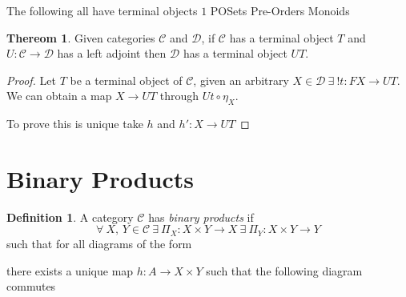 \documentclass{article}
\theoremstyle{definition}
\newtheorem{definition}{Definition}[section]
\newtheorem{theorem}{Thereom}[section]
\newcommand{\C}{\mathcal{C}}
\newcommand{\D}{\mathcal{D}}
\begin{document}
The following all have terminal objects $1$
POSets
Pre-Orders
Monoids

\begin{theorem}
    Given categories $\C$ and $\D$,
    if $\C$ has a terminal object $T$
    and $U : \C \rightarrow \D$ has a left adjoint
    then $\D$ has a terminal object $UT$.
\end{theorem}

\begin{proof}
    Let $T$ be a terminal object of $\C$, given an arbitrary
    $X \in \D\ \exists\ !t : FX \rightarrow UT$.
    We can obtain a map $X \rightarrow UT$ through $Ut \circ \eta_X$.

    To prove this is unique take $h$ and $h\prime : X \rightarrow UT$
\end{proof}


\pagebreak
\section{Binary Products}
\begin{definition}
    A category $\C$ has \textit{binary products} if
    $$
    \forall\ X,\,Y \in \C
    \ \exists\ \Pi_X : X \times Y \rightarrow X
    \ \exists\ \Pi_Y : X \times Y \rightarrow Y
    $$
    such that for all diagrams of the form
    \begin{center}
    \end{center}
    there exists a unique map $h : A \rightarrow X \times Y$
    such that the following diagram commutes
    \begin{center}
    \end{center}
\end{definition}
\end{document}
